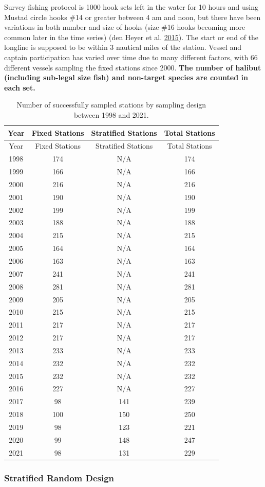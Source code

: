 \documentclass[12pt]{article}\usepackage[]{graphicx}\usepackage[]{color}
\begin{document}
Survey fishing protocol is 1000 hook sets left in the water for 10 hours and using Mustad circle hooks \#14 or greater between 4 am and noon, but there have been variations in both number and size of hooks (size \#16 hooks becoming more common later in the time series) (den Heyer et al. \protect\hyperlink{ref-DenHeyer2015}{2015}). The start or end of the longline is supposed to be within 3 nautical miles of the station. Vessel and captain participation has varied over time due to many different factors, with 66 different vessels sampling the fixed stations since 2000. \textbf{The number of halibut (including sub-legal size fish) and non-target species are counted in each set.}
\begin{longtable}[]{@{}cccc@{}}
\caption{\label{tab:stat-samp}Number of successfully sampled stations by sampling design between 1998 and 2021.}\tabularnewline
\toprule
Year & Fixed Stations & Stratified Stations & Total Stations\tabularnewline
\midrule
\endfirsthead
\toprule
Year & Fixed Stations & Stratified Stations & Total Stations\tabularnewline
\midrule
\endhead
1998 & 174 & N/A & 174\tabularnewline
1999 & 166 & N/A & 166\tabularnewline
2000 & 216 & N/A & 216\tabularnewline
2001 & 190 & N/A & 190\tabularnewline
2002 & 199 & N/A & 199\tabularnewline
2003 & 188 & N/A & 188\tabularnewline
2004 & 215 & N/A & 215\tabularnewline
2005 & 164 & N/A & 164\tabularnewline
2006 & 163 & N/A & 163\tabularnewline
2007 & 241 & N/A & 241\tabularnewline
2008 & 281 & N/A & 281\tabularnewline
2009 & 205 & N/A & 205\tabularnewline
2010 & 215 & N/A & 215\tabularnewline
2011 & 217 & N/A & 217\tabularnewline
2012 & 217 & N/A & 217\tabularnewline
2013 & 233 & N/A & 233\tabularnewline
2014 & 232 & N/A & 232\tabularnewline
2015 & 232 & N/A & 232\tabularnewline
2016 & 227 & N/A & 227\tabularnewline
2017 & 98 & 141 & 239\tabularnewline
2018 & 100 & 150 & 250\tabularnewline
2019 & 98 & 123 & 221\tabularnewline
2020 & 99 & 148 & 247\tabularnewline
2021 & 98 & 131 & 229\tabularnewline
\bottomrule
\end{longtable}
\hypertarget{stratified-random-design}{%
\subsubsection{Stratified Random Design}\label{stratified-random-design}}
\end{document}
